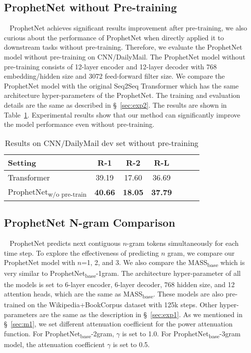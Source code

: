 \documentclass[11pt,a4paper]{article}
\begin{document}
\subsection{ProphetNet without Pre-training}~\label{sec:exp5}
ProphetNet achieves significant results improvement after pre-training, we also curious about the performance of ProphetNet when directly applied it to downstream tasks without pre-training.
Therefore, we evaluate the ProphetNet model without pre-training on CNN/DailyMail.
The ProphetNet model without pre-training consists of 12-layer encoder and 12-layer decoder with 768 embedding/hidden size and 3072 feed-forward filter size.
We compare the ProphetNet model with the original Seq2Seq Transformer which has the same architecture hyper-parameters of the ProphetNet.
The training and evaluation details are the same as described in \S~\ref{sec:exp2}.
The results are shown in Table~\ref{tab:nopretrain}.
Experimental results show that our method can significantly improve the model performance even without pre-training.
\begin{table}[h] 
\small
\begin{center}
\begin{tabular}{lcccccl}
\toprule
    Setting & R-1 & R-2 & R-L \\
    \midrule
 Transformer\scriptsize{~\cite{raffel2019exploring}} & 39.19    &17.60&   36.69\\
 ProphetNet\textsubscript{w/o pre-train} & \textbf{40.66}    & \textbf{18.05} & \textbf{37.79}\\
  \bottomrule
\end{tabular}
\end{center}
\caption{Results on CNN/DailyMail dev set without pre-training}
\label{tab:nopretrain}
\end{table}

\subsection{ProphetNet N-gram Comparison}~\label{sec:exp6}
ProphetNet predicts next contiguous $n$-gram tokens simultaneously for each time step. To explore the effectiveness of predicting $n$ gram, we compare our ProphetNet model with $n$=1, 2, and 3. 
We also compare the MASS\textsubscript{base} which is very similar to ProphetNet\textsubscript{base}-1gram.  The architecture hyper-parameter of all the models is set to 6-layer encoder, 6-layer decoder, 768 hidden size, and 12 attention heads, which are the same as MASS\textsubscript{base}. These models are also pre-trained on the Wikipedia+BookCorpus dataset with 125k steps. Other hyper-parameters are the same as the description in \S~\ref{sec:exp1}. As we mentioned in \S~\ref{sec:m1}, we set different attenuation coefficient for the power attenuation function. For ProphetNet\textsubscript{base}-2gram, $\gamma$ is set to 1.0. For ProphetNet\textsubscript{base}-3gram model, the attenuation coefficient $\gamma$ is set to 0.5.
\end{document}
